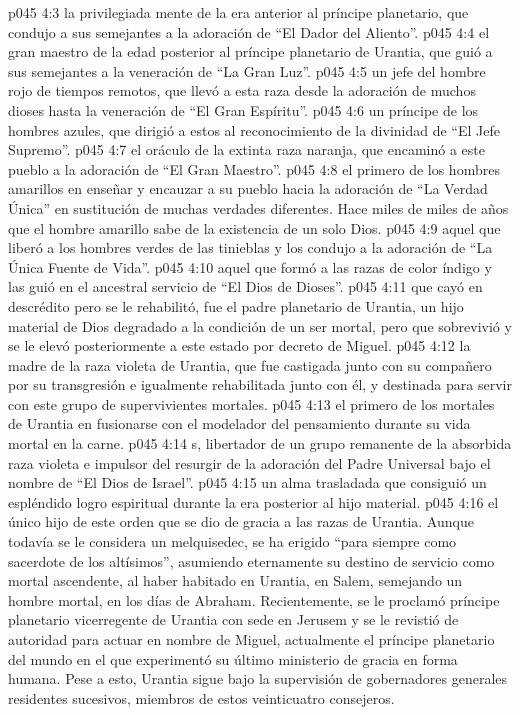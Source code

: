 \vs p045 4:3  la privilegiada mente de la era anterior al príncipe planetario, que condujo a sus semejantes a la adoración de “El Dador del Aliento”.
\vs p045 4:4  el gran maestro de la edad posterior al príncipe planetario de Urantia, que guió a sus semejantes a la veneración de “La Gran Luz”.
\vs p045 4:5  un jefe del hombre rojo de tiempos remotos, que llevó a esta raza desde la adoración de muchos dioses hasta la veneración de “El Gran Espíritu”.
\vs p045 4:6  un príncipe de los hombres azules, que dirigió a estos al reconocimiento de la divinidad de “El Jefe Supremo”.
\vs p045 4:7  el oráculo de la extinta raza naranja, que encaminó a este pueblo a la adoración de “El Gran Maestro”.
\vs p045 4:8  el primero de los hombres amarillos en enseñar y encauzar a su pueblo hacia la adoración de “La Verdad Única” en sustitución de muchas verdades diferentes. Hace miles de miles de años que el hombre amarillo sabe de la existencia de un solo Dios.
\vs p045 4:9  aquel que liberó a los hombres verdes de las tinieblas y los condujo a la adoración de “La Única Fuente de Vida”.
\vs p045 4:10  aquel que formó a las razas de color índigo y las guió en el ancestral servicio de “El Dios de Dioses”.
\vs p045 4:11  que cayó en descrédito pero se le rehabilitó, fue el padre planetario de Urantia, un hijo material de Dios degradado a la condición de un ser mortal, pero que sobrevivió y se le elevó posteriormente a este estado por decreto de Miguel.
\vs p045 4:12  la madre de la raza violeta de Urantia, que fue castigada junto con su compañero por su transgresión e igualmente rehabilitada junto con él, y destinada para servir con este grupo de supervivientes mortales.
\vs p045 4:13  el primero de los mortales de Urantia en fusionarse con el modelador del pensamiento durante su vida mortal en la carne.
\vs p045 4:14 s, libertador de un grupo remanente de la absorbida raza violeta e impulsor del resurgir de la adoración del Padre Universal bajo el nombre de “El Dios de Israel”.
\vs p045 4:15  un alma trasladada que consiguió un espléndido logro espiritual durante la era posterior al hijo material.
\vs p045 4:16  el único hijo de este orden que se dio de gracia a las razas de Urantia. Aunque todavía se le considera un melquisedec, se ha erigido “para siempre como sacerdote de los altísimos”, asumiendo eternamente su destino de servicio como mortal ascendente, al haber habitado en Urantia, en Salem, semejando un hombre mortal, en los días de Abraham. Recientemente, se le proclamó príncipe planetario vicerregente de Urantia con sede en Jerusem y se le revistió de autoridad para actuar en nombre de Miguel, actualmente el príncipe planetario del mundo en el que experimentó su último ministerio de gracia en forma humana. Pese a esto, Urantia sigue bajo la supervisión de gobernadores generales residentes sucesivos, miembros de estos veinticuatro consejeros.
